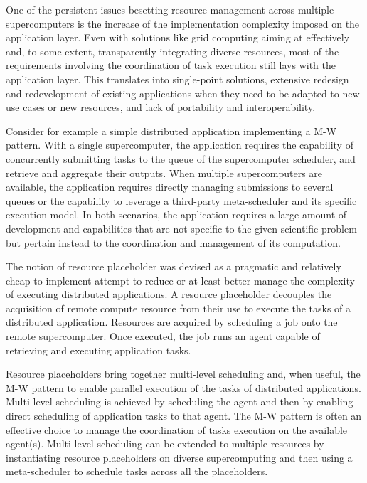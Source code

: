 \documentclass{sig-alternate}
\begin{document}
One of the persistent issues besetting resource management across multiple
supercomputers is the increase of the implementation complexity imposed on the
application layer. Even with solutions like grid computing aiming at
effectively and, to some extent, transparently integrating diverse resources,
most of the requirements involving the coordination of task execution still
lays with the application layer. This translates into single-point solutions,
extensive redesign and redevelopment of existing applications when they need to
be adapted to new use cases or new resources, and lack of portability and
interoperability.

Consider for example a simple distributed application implementing a M-W
pattern. With a single supercomputer, the application requires the capability
of concurrently submitting tasks to the queue of the supercomputer scheduler,
and retrieve and aggregate their outputs. When multiple supercomputers are
available, the application requires directly managing submissions to several
queues or the capability to leverage a third-party meta-scheduler and its
specific execution model. In both scenarios, the application requires a large
amount of development and capabilities that are not specific to the given
scientific problem but pertain instead to the coordination and management of
its computation.

The notion of resource placeholder was devised as a pragmatic and relatively
cheap to implement attempt to reduce or at least better manage the complexity
of executing distributed applications. A resource placeholder decouples the
acquisition of remote compute resource from their use to execute the tasks of a
distributed application. Resources are acquired by scheduling a job onto the
remote supercomputer. Once executed, the job runs an agent capable of
retrieving and executing application tasks.

Resource placeholders bring together multi-level scheduling and, when useful,
the M-W pattern to enable parallel execution of the tasks of distributed
applications. Multi-level scheduling is achieved by scheduling the agent and
then by enabling direct scheduling of application tasks to that agent. The M-W
pattern is often an effective choice to manage the coordination of tasks
execution on the available agent(s). Multi-level scheduling can be extended to
multiple resources by instantiating resource placeholders on diverse
supercomputing and then using a meta-scheduler to schedule tasks across all the
placeholders.
\end{document}
